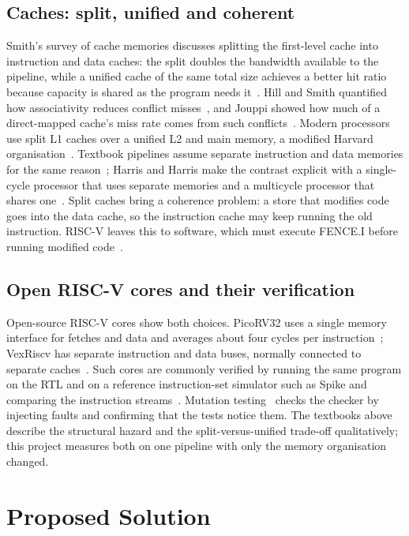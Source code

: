 \documentclass[conference]{IEEEtran}
\begin{document}
\subsection{Caches: split, unified and coherent}
Smith's survey of cache memories discusses splitting the first-level cache into instruction and data caches: the split doubles the bandwidth available to the pipeline, while a unified cache of the same total size achieves a better hit ratio because capacity is shared as the program needs it~\cite{smith}. Hill and Smith quantified how associativity reduces conflict misses~\cite{hill}, and Jouppi showed how much of a direct-mapped cache's miss rate comes from such conflicts~\cite{jouppi}. Modern processors use split L1 caches over a unified L2 and main memory, a modified Harvard organisation~\cite{hp-quant}. Textbook pipelines assume separate instruction and data memories for the same reason~\cite{ph-riscv}; Harris and Harris make the contrast explicit with a single-cycle processor that uses separate memories and a multicycle processor that shares one~\cite{harris}. Split caches bring a coherence problem: a store that modifies code goes into the data cache, so the instruction cache may keep running the old instruction. RISC-V leaves this to software, which must execute FENCE.I before running modified code~\cite{riscv-spec}.

\subsection{Open RISC-V cores and their verification}
Open-source RISC-V cores show both choices. PicoRV32 uses a single memory interface for fetches and data and averages about four cycles per instruction~\cite{picorv32}; VexRiscv has separate instruction and data buses, normally connected to separate caches~\cite{vexriscv}. Such cores are commonly verified by running the same program on the RTL and on a reference instruction-set simulator such as Spike and comparing the instruction streams~\cite{spike}. Mutation testing~\cite{demillo} checks the checker by injecting faults and confirming that the tests notice them. The textbooks above describe the structural hazard and the split-versus-unified trade-off qualitatively; this project measures both on one pipeline with only the memory organisation changed.

\section{Proposed Solution}
\end{document}
